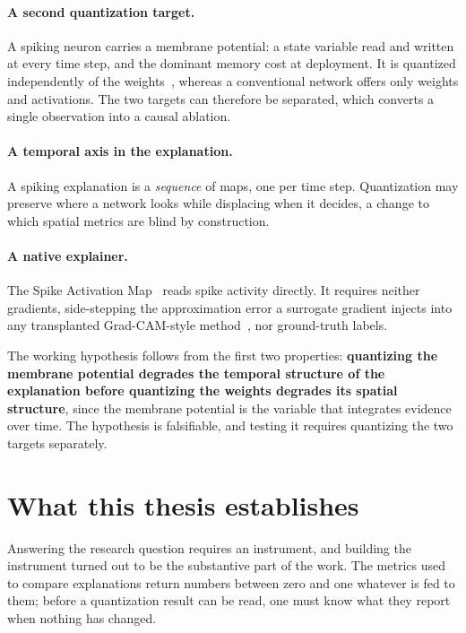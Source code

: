 \paragraph{A second quantization target.} A spiking neuron carries a membrane
potential: a state variable read and written at every time step, and the
dominant memory cost at deployment. It is quantized independently of the
weights~\cite{yin2024mint}, whereas a conventional network offers only weights
and activations. The two targets can therefore be separated, which converts a
single observation into a causal ablation.

\paragraph{A temporal axis in the explanation.} A spiking explanation is a
\emph{sequence} of maps, one per time step. Quantization may preserve where a
network looks while displacing when it decides, a change to which spatial
metrics are blind by construction.

\paragraph{A native explainer.} The Spike Activation
Map~\cite{kim2021sam} reads spike activity directly. It requires neither
gradients, side-stepping the approximation error a surrogate gradient injects
into any transplanted Grad-CAM-style method~\cite{selvaraju2017gradcam}, nor
ground-truth labels.

The working hypothesis follows from the first two properties: \textbf{quantizing
the membrane potential degrades the temporal structure of the explanation before
quantizing the weights degrades its spatial structure}, since the membrane
potential is the variable that integrates evidence over time. The hypothesis is
falsifiable, and testing it requires quantizing the two targets separately.

\section{What this thesis establishes}

Answering the research question requires an instrument, and building the
instrument turned out to be the substantive part of the work. The metrics used
to compare explanations return numbers between zero and one whatever is fed to
them; before a quantization result can be read, one must know what they report
when nothing has changed.

